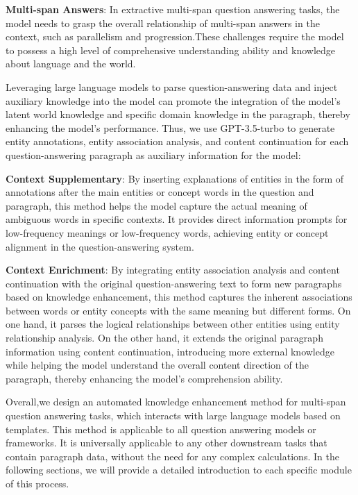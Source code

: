 \documentclass[a4paper,fleqn,twocolumn]{cas-dc}
\newcommand{\1}[1]{\mathds{1}\left[#1\right]}
\begin{document}
	\textbf{Multi-span Answers}: In extractive multi-span question answering tasks, the model needs to grasp the overall relationship of multi-span answers in the context, such as parallelism and progression.These challenges require the model to possess a high level of comprehensive understanding ability and knowledge about language and the world. 
	
	Leveraging large language models to parse question-answering data and inject auxiliary knowledge into the model can promote the integration of the model's latent world knowledge and specific domain knowledge in the paragraph, thereby enhancing the model's performance. Thus, we use GPT-3.5-turbo to generate entity annotations, entity association analysis, and content continuation for each question-answering paragraph as auxiliary information for the model:
	
	\textbf{Context Supplementary}: By inserting explanations of entities in the form of annotations after the main entities or concept words in the question and paragraph, this method helps the model capture the actual meaning of ambiguous words in specific contexts. It provides direct information prompts for low-frequency meanings or low-frequency words, achieving entity or concept alignment in the question-answering system.
	
	\textbf{Context Enrichment}: By integrating entity association analysis and content continuation with the original question-answering text to form new paragraphs based on knowledge enhancement, this method captures the inherent associations between words or entity concepts with the same meaning but different forms. On one hand, it parses the logical relationships between other entities using entity relationship analysis. On the other hand, it extends the original paragraph information using content continuation, introducing more external knowledge while helping the model understand the overall content direction of the paragraph, thereby enhancing the model's comprehension ability.

	
	Overall,we design an automated knowledge enhancement method for multi-span question answering tasks, which interacts with large language models based on templates. This method is applicable to all question answering models or frameworks. It is universally applicable to any other downstream tasks that contain paragraph data, without the need for any complex calculations. In the following sections, we will provide a detailed introduction to each specific module of this process.
\end{document}
